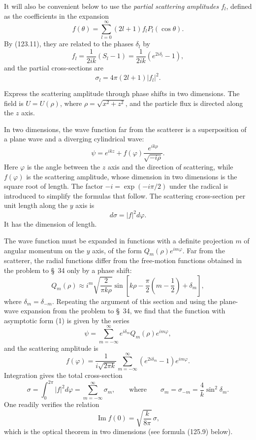 It will also be convenient below to use the \emph{partial scattering amplitudes} $f_l$, defined as the coefficients in the expansion
\begin{equation}
 f(\theta)=\sum_{l=0}^\infty(2l+1)f_lP_l(\cos\theta).
 \tag{123.14}
\end{equation}
By (123.11), they are related to the phases $\delta_l$ by
\begin{equation}
 f_l=\frac1{2ik}(S_l-1)=\frac1{2ik}(e^{2i\delta_l}-1),
 \tag{123.15}
\end{equation}
and the partial cross-sections are
\begin{equation}
 \sigma_l=4\pi(2l+1)|f_l|^2.
 \tag{123.16}
\end{equation}

\ProblemHeading
Express the scattering amplitude through phase shifts in two dimensions. The field is $U=U(\rho)$, where $\rho=\sqrt{x^2+z^2}$, and the particle flux is directed along the $z$ axis.

\SolutionHeading In two dimensions, the wave function far from the scatterer is a superposition of a plane wave and a diverging cylindrical wave:
\begin{equation}
 \psi=e^{ikz}+f(\varphi)\frac{e^{ik\rho}}{\sqrt{-i\rho}}.
 \tag{1}
\end{equation}
Here $\varphi$ is the angle between the $z$ axis and the direction of scattering, while $f(\varphi)$ is the scattering amplitude, whose dimension in two dimensions is the square root of length. The factor $-i=\exp(-i\pi/2)$ under the radical is introduced to simplify the formulas that follow. The scattering cross-section per unit length along the $y$ axis is
\[
 d\sigma=|f|^2d\varphi.
\]
It has the dimension of length.

The wave function must be expanded in functions with a definite projection $m$ of angular momentum on the $y$ axis, of the form $Q_m(\rho)e^{im\varphi}$. Far from the scatterer, the radial functions differ from the free-motion functions obtained in the problem to \S~34 only by a phase shift:
\[
 Q_m(\rho)\approx i^m\sqrt{\frac2{\pi k\rho}}
 \sin\left[k\rho-\frac\pi2\left(m-\frac12\right)+\delta_m\right],
\]
where $\delta_m=\delta_{-m}$. Repeating the argument of this section and using the plane-wave expansion from the problem to \S~34, we find that the function with asymptotic form (1) is given by the series
\[
 \psi=\sum_{m=-\infty}^{\infty}e^{i\delta_m}Q_m(\rho)e^{im\varphi},
\]
and the scattering amplitude is
\begin{equation}
 f(\varphi)=\frac1{i\sqrt{2\pi k}}
 \sum_{m=-\infty}^{\infty}(e^{2i\delta_m}-1)e^{im\varphi}.
 \tag{2}
\end{equation}
Integration gives the total cross-section
\[
 \sigma=\int_0^{2\pi}|f|^2d\varphi
 =\sum_{m=-\infty}^{\infty}\sigma_m,
 \qquad \text{where}\qquad
 \sigma_m=\sigma_{-m}=\frac4k\sin^2\delta_m.
\]
One readily verifies the relation
\begin{equation}
 \operatorname{Im}f(0)=\sqrt{\frac{k}{8\pi}}\,\sigma,
 \tag{3}
\end{equation}
which is the optical theorem in two dimensions (see formula (125.9) below).

